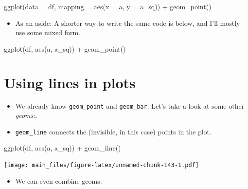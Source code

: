 \documentclass[
]{book}
\newenvironment{Shaded}{\begin{snugshade}}{\end{snugshade}}
\newcommand{\AttributeTok}[1]{\textcolor[rgb]{0.77,0.63,0.00}{#1}}
\newcommand{\FunctionTok}[1]{\textcolor[rgb]{0.00,0.00,0.00}{#1}}
\newcommand{\NormalTok}[1]{#1}
\newcommand{\SpecialCharTok}[1]{\textcolor[rgb]{0.00,0.00,0.00}{#1}}
\providecommand{\tightlist}{%
  \setlength{\itemsep}{0pt}\setlength{\parskip}{0pt}}
\begin{document}
\begin{Shaded}
\begin{Highlighting}[]
\FunctionTok{ggplot}\NormalTok{(}\AttributeTok{data =}\NormalTok{ df, }\AttributeTok{mapping =} \FunctionTok{aes}\NormalTok{(}\AttributeTok{x =}\NormalTok{ a, }\AttributeTok{y =}\NormalTok{ a\_sq)) }\SpecialCharTok{+} \FunctionTok{geom\_point}\NormalTok{()}
\end{Highlighting}
\end{Shaded}

\begin{itemize}
\tightlist
\item
  As an aside: A shorter way to write the same code is below, and I'll mostly use some mixed form.
\end{itemize}

\begin{Shaded}
\begin{Highlighting}[]
\FunctionTok{ggplot}\NormalTok{(df, }\FunctionTok{aes}\NormalTok{(a, a\_sq)) }\SpecialCharTok{+} \FunctionTok{geom\_point}\NormalTok{()}
\end{Highlighting}
\end{Shaded}

\hypertarget{using-lines-in-plots}{%
\section{Using lines in plots}\label{using-lines-in-plots}}

\begin{itemize}
\item
  We already know \texttt{geom\_point} and \texttt{geom\_bar}. Let's take a look at some other \emph{geoms}:.
\item
  \texttt{geom\_line} connects the (invisible, in this case) points in the plot.
\end{itemize}

\begin{Shaded}
\begin{Highlighting}[]
\FunctionTok{ggplot}\NormalTok{(df, }\FunctionTok{aes}\NormalTok{(a, a\_sq)) }\SpecialCharTok{+} \FunctionTok{geom\_line}\NormalTok{()}
\end{Highlighting}
\end{Shaded}

\texttt{[image: main\_files/figure-latex/unnamed-chunk-143-1.pdf]}

\begin{itemize}
\tightlist
\item
  We can even combine geoms:
\end{itemize}
\end{document}
